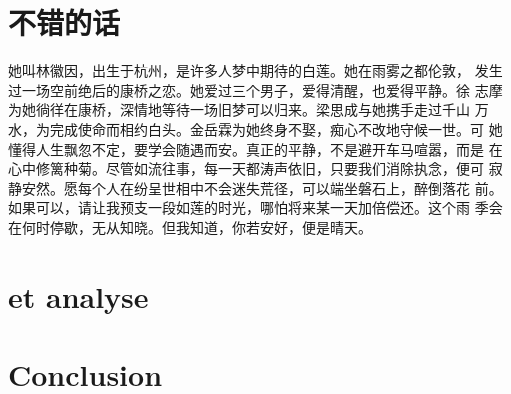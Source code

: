\documentclass[a4paper, 11pt,twoside=false]{scrartcl} %
\begin{document}
\section{不错的话}
她叫林徽因，出生于杭州，是许多人梦中期待的白莲。她在雨雾之都伦敦，
发生过一场空前绝后的康桥之恋。她爱过三个男子，爱得清醒，也爱得平静。徐
志摩为她徜徉在康桥，深情地等待一场旧梦可以归来。梁思成与她携手走过千山
万水，为完成使命而相约白头。金岳霖为她终身不娶，痴心不改地守候一世。可
她懂得人生飘忽不定，要学会随遇而安。真正的平静，不是避开车马喧嚣，而是
在心中修篱种菊。尽管如流往事，每一天都涛声依旧，只要我们消除执念，便可
寂静安然。愿每个人在纷呈世相中不会迷失荒径，可以端坐磐石上，醉倒落花
前。如果可以，请让我预支一段如莲的时光，哪怕将来某一天加倍偿还。这个雨
季会在何时停歇，无从知晓。但我知道，你若安好，便是晴天。
\section{ et analyse}
\lipsum[30]
\section{Conclusion}
\lipsum[20]
\end{document}
